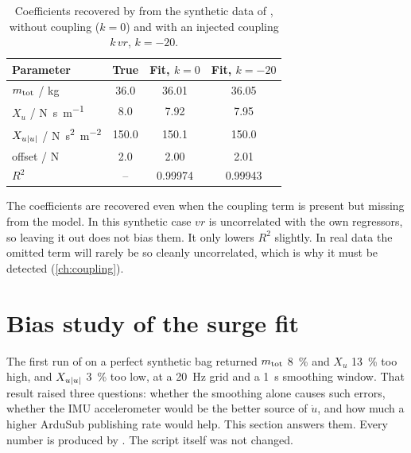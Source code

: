 \begin{table}[htbp]
\centering
\caption{Coefficients recovered by  from the synthetic data of
, without coupling ($k = 0$) and with an injected
coupling $k\,vr$, $k = -20$.}
\label{tab:synthetic-fit}
\begin{tabular}{@{}l S[table-format=3.1] S[table-format=3.2] S[table-format=3.2]@{}}
\toprule
Parameter & {True} & {Fit, $k=0$} & {Fit, $k=-20$} \\
\midrule
$m_\mathrm{tot}$ / \unit{\kilogram} & 36.0 & 36.01 & 36.05 \\
$X_u$ / \unit{\newton\second\per\meter} & 8.0 & 7.92 & 7.95 \\
$X_{u|u|}$ / \unit{\newton\second\squared\per\meter\squared} & 150.0 & 150.1 & 150.0 \\
offset / \unit{\newton} & 2.0 & 2.00 & 2.01 \\
$R^2$ & {--} & 0.99974 & 0.99943 \\
\bottomrule
\end{tabular}
\end{table}
\FloatBarrier

The coefficients are recovered even when the coupling term is present but missing from the
model. In this synthetic case $vr$ is uncorrelated with the own regressors, so leaving it out
does not bias them. It only lowers $R^2$ slightly. In real data the omitted term will rarely be
so cleanly uncorrelated, which is why it must be detected (\cref{ch:coupling}).

\section{Bias study of the surge fit}
\label{sec:bias-study}

\begin{revised}[title={New section, added 16 October 2026},breakable]
The first run of  on a perfect synthetic bag returned $m_\mathrm{tot}$
\qty{8}{\percent} and $X_u$ \qty{13}{\percent} too high, and $X_{u|u|}$ \qty{3}{\percent} too low,
at a \qty{20}{\hertz} grid and a \qty{1}{\second} smoothing window. That result raised three
questions: whether the smoothing alone causes such errors, whether the IMU accelerometer would be
the better source of $\dot u$, and how much a higher ArduSub publishing rate would help. This
section answers them. Every number is produced by . The script
 itself was not changed.
\end{revised}


